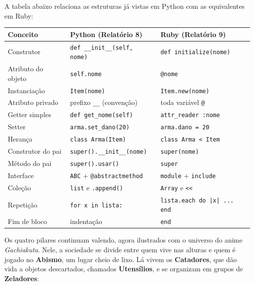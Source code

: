 A tabela abaixo relaciona as estruturas já vistas em Python com as equivalentes em Ruby:

\begin{center}
\begin{tabular}{|l|l|l|}
\hline
\textbf{Conceito} & \textbf{Python (Relatório 8)} & \textbf{Ruby (Relatório 9)} \\
\hline
Construtor & \texttt{def \_\_init\_\_(self, nome)} & \texttt{def initialize(nome)} \\
Atributo do objeto & \texttt{self.nome} & \texttt{@nome} \\
Instanciação & \texttt{Item(nome)} & \texttt{Item.new(nome)} \\
Atributo privado & prefixo \texttt{\_\_} (convenção) & toda variável \texttt{@} \\
Getter simples & \texttt{def get\_nome(self)} & \texttt{attr\_reader :nome} \\
Setter & \texttt{arma.set\_dano(20)} & \texttt{arma.dano = 20} \\
Herança & \texttt{class Arma(Item)} & \texttt{class Arma < Item} \\
Construtor do pai & \texttt{super().\_\_init\_\_(nome)} & \texttt{super(nome)} \\
Método do pai & \texttt{super().usar()} & \texttt{super} \\
Interface & \texttt{ABC} + \texttt{@abstractmethod} & \texttt{module} + \texttt{include} \\
Coleção & \texttt{list} e \texttt{.append()} & \texttt{Array} e \texttt{<{}<} \\
Repetição & \texttt{for x in lista:} & \texttt{lista.each do |x| ... end} \\
Fim de bloco & indentação & \texttt{end} \\
\hline
\end{tabular}
\end{center}

Os quatro pilares continuam valendo, agora ilustrados com o universo do anime
\textit{Gachiakuta}. Nele, a sociedade se divide entre quem vive nas alturas e quem é jogado no
\textbf{Abismo}, um lugar cheio de lixo. Lá vivem os \textbf{Catadores}, que dão vida a objetos
descartados, chamados \textbf{Utensílios}, e se organizam em grupos de \textbf{Zeladores}:

